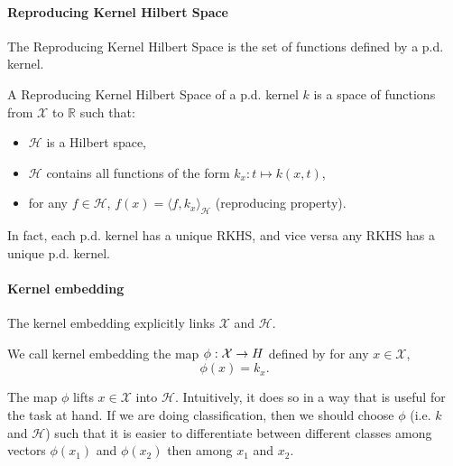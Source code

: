 \paragraph{Reproducing Kernel Hilbert Space}
The Reproducing Kernel Hilbert Space is the set of functions defined by a p.d. kernel.
\begin{mdframed}
\begin{definition}
A Reproducing Kernel Hilbert Space of a p.d. kernel $k$ is a space of functions from $\mathcal X$ to $\mathbb R$ such that:
\begin{itemize}
\item $\mathcal H$ is a Hilbert space,
\item $\mathcal H$ contains all functions of the form $k_x: t\mapsto k(x, t)$,
\item for any $f\in\mathcal H$, $f(x) = \langle f, k_x\rangle_\mathcal H$ (reproducing property).
\end{itemize}
\end{definition}
\end{mdframed}
In fact, each p.d. kernel has a unique RKHS, and vice versa any RKHS has a unique p.d. kernel.\citep{aronjxan1950}

\paragraph{Kernel embedding}
The kernel embedding explicitly links $\mathcal X$ and $\mathcal H$.
\begin{mdframed}
\begin{definition}
We call kernel embedding the map $\phi: \mathcal X \to \mathbb \mathcal H$ defined by for any $x\in\mathcal X$,
$$ \phi(x) = k_x.$$
\end{definition}
\end{mdframed}

The map $\phi$ lifts $x\in\mathcal X$ into $\mathcal H$. Intuitively, it does so in a way that is useful for the task at hand. If we are doing classification, then we should choose $\phi$ (i.e. $k$ and $\mathcal H$) such that it is easier to differentiate between different classes among vectors $\phi(x_1)$ and $\phi(x_2)$ then among $x_1$ and $x_2$. %

